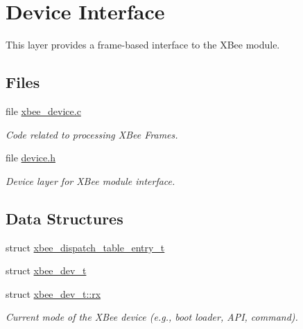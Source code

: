 \hypertarget{group__xbee__device}{}\section{Device Interface}
\label{group__xbee__device}


This layer provides a frame-\/based interface to the X\+Bee module.  


\subsection*{Files}
\begin{DoxyCompactItemize}
\item 
file \hyperlink{xbee__device_8c}{xbee\+\_\+device.\+c}
\begin{DoxyCompactList}\small\item\em Code related to processing X\+Bee Frames. \end{DoxyCompactList}\item 
file \hyperlink{device_8h}{device.\+h}
\begin{DoxyCompactList}\small\item\em Device layer for X\+Bee module interface. \end{DoxyCompactList}\end{DoxyCompactItemize}
\subsection*{Data Structures}
\begin{DoxyCompactItemize}
\item 
struct \hyperlink{structxbee__dispatch__table__entry__t}{xbee\+\_\+dispatch\+\_\+table\+\_\+entry\+\_\+t}
\item 
struct \hyperlink{structxbee__dev__t}{xbee\+\_\+dev\+\_\+t}
\item 
struct \hyperlink{structxbee__dev__t_1_1rx}{xbee\+\_\+dev\+\_\+t\+::rx}
\begin{DoxyCompactList}\small\item\em Current mode of the X\+Bee device (e.\+g., boot loader, A\+PI, command). \end{DoxyCompactList}\end{DoxyCompactItemize}
